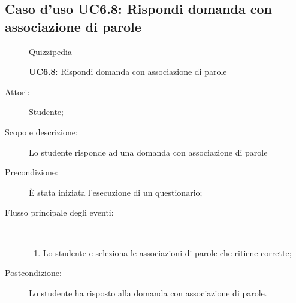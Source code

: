 \subsection{Caso d'uso UC6.8: Rispondi domanda con associazione di parole}
	\begin{figure}[H]
		\centering
		\begin{resizedtikzpicture}{\textwidth}
		\begin{umlsystem}[x=0, fill=lightgray!20]{Quizzipedia}
		\end{umlsystem}
		\end{resizedtikzpicture}
		\caption{\textbf{UC6.8}: Rispondi domanda con associazione di parole}
		\label{UC6.8}
	\end{figure}
\begin{description}
\item[Attori:] Studente;
\item[Scopo e descrizione:] Lo studente risponde ad una domanda con associazione di parole
      \item[Precondizione:] È stata iniziata l'esecuzione di un questionario;

        \item[Flusso principale degli eventi:] \ 
 \begin{enumerate}
          \item Lo studente e seleziona le associazioni di parole che ritiene corrette;

      \end{enumerate}
    \item[Postcondizione:] Lo studente ha risposto alla domanda con associazione di parole.
  \end{description}
\hypertarget{UC6.9}{}
